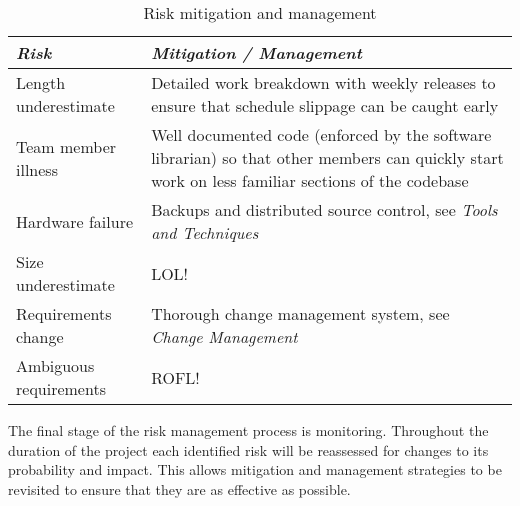 \begin{table*}
	\small
	\begin{tabular}{l p{37em}}
		\toprule
		\emph{Risk} & \emph{Mitigation / Management} \\
		\midrule
		Length underestimate & Detailed work breakdown with weekly releases to ensure that
			schedule slippage can be caught early \\
		Team member illness & Well documented code (enforced by the software librarian) so
			that other members can quickly start work on less familiar sections of
			the codebase \\
		Hardware failure & Backups and distributed source control, see \emph{Tools and Techniques} \\
		Size underestimate & LOL! \\
		Requirements change & Thorough change management system, see \emph{Change Management} \\
		Ambiguous requirements & ROFL! \\
		\bottomrule
	\end{tabular}
	\vspace{1.5em}
	\caption{Risk mitigation and management}
	\label{tab:rmm}
\end{table*}

The final stage of the risk management process is monitoring. Throughout the duration of
the project each identified risk will be reassessed for changes to its probability and
impact. This allows mitigation and management strategies to be revisited to ensure that
they are as effective as possible.
